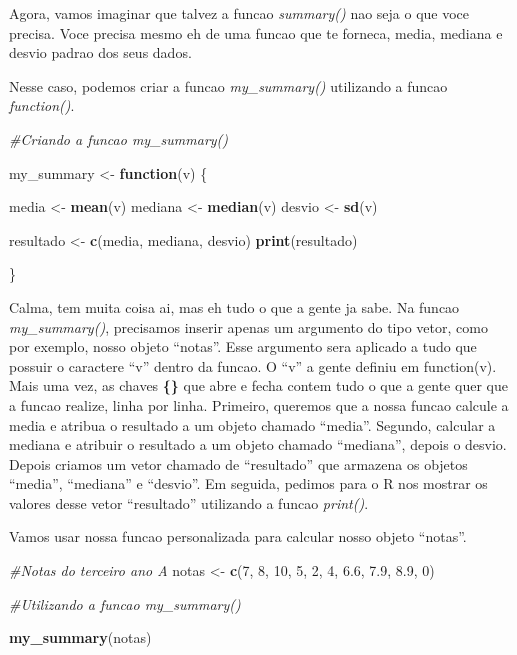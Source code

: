 \documentclass[
]{book}
\newenvironment{Shaded}{\begin{snugshade}}{\end{snugshade}}
\newcommand{\CommentTok}[1]{\textcolor[rgb]{0.56,0.35,0.01}{\textit{#1}}}
\newcommand{\ControlFlowTok}[1]{\textcolor[rgb]{0.13,0.29,0.53}{\textbf{#1}}}
\newcommand{\DecValTok}[1]{\textcolor[rgb]{0.00,0.00,0.81}{#1}}
\newcommand{\FloatTok}[1]{\textcolor[rgb]{0.00,0.00,0.81}{#1}}
\newcommand{\FunctionTok}[1]{\textcolor[rgb]{0.13,0.29,0.53}{\textbf{#1}}}
\newcommand{\NormalTok}[1]{#1}
\newcommand{\OtherTok}[1]{\textcolor[rgb]{0.56,0.35,0.01}{#1}}
\begin{document}
Agora, vamos imaginar que talvez a funcao \emph{summary()} nao seja o que voce precisa. Voce precisa mesmo eh de uma funcao que te forneca, media, mediana e desvio padrao dos seus dados.

Nesse caso, podemos criar a funcao \emph{my\_summary()} utilizando a funcao \emph{function()}.

\begin{Shaded}
\begin{Highlighting}[]
\CommentTok{\#Criando a funcao my\_summary()}

\NormalTok{my\_summary }\OtherTok{\textless{}{-}} \ControlFlowTok{function}\NormalTok{(v) \{}

\NormalTok{media   }\OtherTok{\textless{}{-}} \FunctionTok{mean}\NormalTok{(v)}
\NormalTok{mediana }\OtherTok{\textless{}{-}} \FunctionTok{median}\NormalTok{(v)}
\NormalTok{desvio  }\OtherTok{\textless{}{-}} \FunctionTok{sd}\NormalTok{(v)}

\NormalTok{resultado }\OtherTok{\textless{}{-}} \FunctionTok{c}\NormalTok{(media, mediana, desvio)}
\FunctionTok{print}\NormalTok{(resultado)}

\NormalTok{\}}
\end{Highlighting}
\end{Shaded}

Calma, tem muita coisa ai, mas eh tudo o que a gente ja sabe. Na funcao \emph{my\_summary()}, precisamos inserir apenas um argumento do tipo vetor, como por exemplo, nosso objeto ``notas''. Esse argumento sera aplicado a tudo que possuir o caractere ``v'' dentro da funcao. O ``v'' a gente definiu em function(v). Mais uma vez, as chaves \textbf{\{\}} que abre e fecha contem tudo o que a gente quer que a funcao realize, linha por linha. Primeiro, queremos que a nossa funcao calcule a media e atribua o resultado a um objeto chamado ``media''. Segundo, calcular a mediana e atribuir o resultado a um objeto chamado ``mediana'', depois o desvio. Depois criamos um vetor chamado de ``resultado'' que armazena os objetos ``media'', ``mediana'' e ``desvio''. Em seguida, pedimos para o R nos mostrar os valores desse vetor ``resultado'' utilizando a funcao \emph{print()}.

Vamos usar nossa funcao personalizada para calcular nosso objeto ``notas''.

\begin{Shaded}
\begin{Highlighting}[]
\CommentTok{\#Notas do terceiro ano A}
\NormalTok{notas }\OtherTok{\textless{}{-}} \FunctionTok{c}\NormalTok{(}\DecValTok{7}\NormalTok{, }\DecValTok{8}\NormalTok{, }\DecValTok{10}\NormalTok{, }\DecValTok{5}\NormalTok{, }\DecValTok{2}\NormalTok{, }\DecValTok{4}\NormalTok{, }\FloatTok{6.6}\NormalTok{, }\FloatTok{7.9}\NormalTok{, }\FloatTok{8.9}\NormalTok{, }\DecValTok{0}\NormalTok{)}

\CommentTok{\#Utilizando a funcao my\_summary()}

\FunctionTok{my\_summary}\NormalTok{(notas)}
\end{Highlighting}
\end{Shaded}
\end{document}
